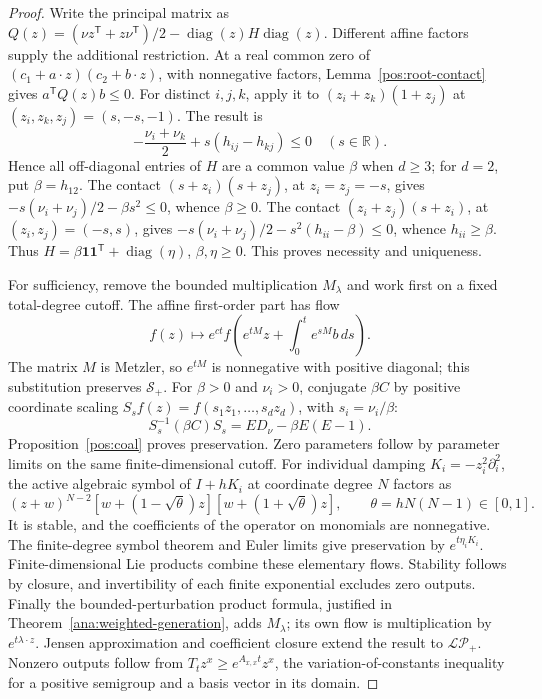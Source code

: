 \documentclass[reqno]{amsart}
\theoremstyle{definition}
\theoremstyle{remark}
\newcommand{\R}{\mathbb R}
\DeclareMathOperator{\diag}{diag}
\begin{document}
\begin{proof}
Write the principal matrix as
\(Q(z)=(\nu z^{\mathsf T}+z\nu^{\mathsf T})/2-
\diag(z)H\diag(z)\).  Different affine factors supply the additional restriction.
At a real common zero of
\((c_1+a\cdot z)(c_2+b\cdot z)\), with nonnegative factors,
Lemma~\ref{pos:root-contact} gives \(a^{\mathsf T}Q(z)b\le0\).
For distinct \(i,j,k\), apply it to \((z_i+z_k)(1+z_j)\) at
\((z_i,z_k,z_j)=(s,-s,-1)\).  The result is
\[
 -\frac{\nu_i+\nu_k}{2}+s(h_{ij}-h_{kj})\le0\quad(s\in\R).
\]
Hence all off-diagonal entries of \(H\) are a common value \(\beta\) when
\(d\ge3\); for \(d=2\), put \(\beta=h_{12}\).
The contact \((s+z_i)(s+z_j)\), at \(z_i=z_j=-s\), gives
\(-s(\nu_i+\nu_j)/2-\beta s^2\le0\), whence \(\beta\ge0\).
The contact \((z_i+z_j)(s+z_i)\), at \((z_i,z_j)=(-s,s)\), gives
\(-s(\nu_i+\nu_j)/2-s^2(h_{ii}-\beta)\le0\), whence \(h_{ii}\ge\beta\).
Thus \(H=\beta\boldsymbol1\boldsymbol1^{\mathsf T}+\diag(\eta)\),
\(\beta,\eta\ge0\).  This proves necessity and uniqueness.

For sufficiency, remove the bounded multiplication \(M_\lambda\) and work first
on a fixed total-degree cutoff.  The affine first-order part has flow
\[
 f(z)\longmapsto e^{ct}
 f\left(e^{tM}z+\int_0^te^{sM}b\,ds\right).
\]
The matrix \(M\) is Metzler, so \(e^{tM}\) is nonnegative with positive diagonal;
this substitution preserves \(\mathcal S_+\).
For \(\beta>0\) and \(\nu_i>0\), conjugate \(\beta C\) by positive coordinate
scaling \(S_sf(z)=f(s_1z_1,\ldots,s_dz_d)\), with \(s_i=\nu_i/\beta\):
\[
 S_s^{-1}(\beta C)S_s=ED_\nu-\beta E(E-1).
\]
Proposition~\ref{pos:coal} proves preservation.  Zero parameters follow by
parameter limits on the same finite-dimensional cutoff.
For individual damping \(K_i=-z_i^2\partial_i^2\), the active algebraic symbol of
\(I+hK_i\) at coordinate degree \(N\) factors as
\[
 (z+w)^{N-2}
 [w+(1-\sqrt\theta)z][w+(1+\sqrt\theta)z],
 \qquad\theta=hN(N-1)\in[0,1].
\]
It is stable, and the coefficients of the operator on monomials are nonnegative.
The finite-degree symbol theorem and Euler limits give preservation by
\(e^{t\eta_iK_i}\).  Finite-dimensional Lie products combine these elementary
flows.  Stability follows by closure, and invertibility of each finite
exponential excludes zero outputs.
Finally the bounded-perturbation product formula, justified in
Theorem~\ref{ana:weighted-generation}, adds \(M_\lambda\); its own flow is
multiplication by \(e^{t\lambda\cdot z}\).  Jensen approximation and coefficient
closure extend the result to \(\mathcal{LP}_+\).  Nonzero outputs follow from
\(T_tz^x\ge e^{A_{x,x}t}z^x\), the variation-of-constants inequality for a positive
semigroup and a basis vector in its domain.
\end{proof}
\end{document}
